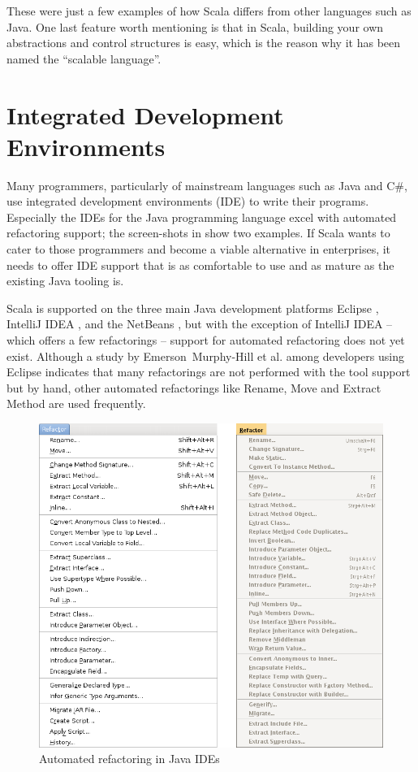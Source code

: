 \documentclass[10pt,a4paper,oneside]{scrreprt}
\begin{document}
These were just a few examples of how Scala differs from other languages such as Java. One last feature worth mentioning is that in Scala, building your own abstractions and control structures is easy, which is the reason why it has been named the ``scalable language''.

\section{Integrated Development Environments}

Many programmers, particularly of mainstream languages such as Java and C\#, use integrated development environments (IDE) to write their programs. Especially the IDEs for the Java programming language excel with automated refactoring support; the screen-shots in  show two examples. If Scala wants to cater to those programmers and become a viable alternative in enterprises, it needs to offer IDE support that is as comfortable to use and as mature as the existing Java tooling is.

Scala is supported on the three main Java development platforms Eclipse \cite{EclipseScalaIDE}, IntelliJ IDEA \cite{IntelliJScalaIDE}, and the NetBeans \cite{NetBeansJScalaIDE}, but with the exception of IntelliJ IDEA -- which offers a few refactorings -- support for automated refactoring does not yet exist. Although a study by Emerson~Murphy-Hill et al. among developers using Eclipse \cite{RefactoringStudy} indicates that many refactorings are not performed with the tool support but by hand, other automated refactorings like Rename, Move and Extract Method are used frequently.

\begin{figure}
 \centering
 \includegraphics[width=0.7\linewidth]{ide_refactorings.png}
 \caption{Automated refactoring in Java IDEs}
 \label{figure:ide_refactorings}
\end{figure}
\end{document}
